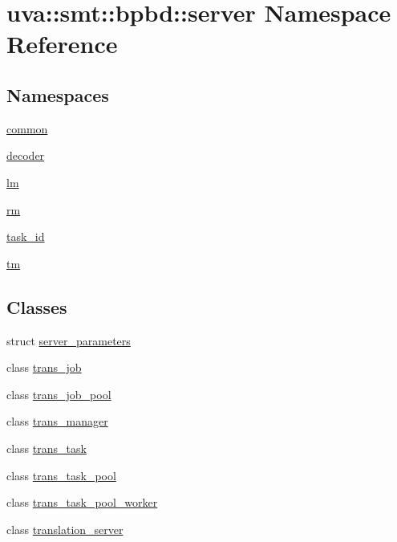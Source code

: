 \hypertarget{namespaceuva_1_1smt_1_1bpbd_1_1server}{}\section{uva\+:\+:smt\+:\+:bpbd\+:\+:server Namespace Reference}
\label{namespaceuva_1_1smt_1_1bpbd_1_1server}
\subsection*{Namespaces}
\begin{DoxyCompactItemize}
\item 
 \hyperlink{namespaceuva_1_1smt_1_1bpbd_1_1server_1_1common}{common}
\item 
 \hyperlink{namespaceuva_1_1smt_1_1bpbd_1_1server_1_1decoder}{decoder}
\item 
 \hyperlink{namespaceuva_1_1smt_1_1bpbd_1_1server_1_1lm}{lm}
\item 
 \hyperlink{namespaceuva_1_1smt_1_1bpbd_1_1server_1_1rm}{rm}
\item 
 \hyperlink{namespaceuva_1_1smt_1_1bpbd_1_1server_1_1task__id}{task\+\_\+id}
\item 
 \hyperlink{namespaceuva_1_1smt_1_1bpbd_1_1server_1_1tm}{tm}
\end{DoxyCompactItemize}
\subsection*{Classes}
\begin{DoxyCompactItemize}
\item 
struct \hyperlink{structuva_1_1smt_1_1bpbd_1_1server_1_1server__parameters}{server\+\_\+parameters}
\item 
class \hyperlink{classuva_1_1smt_1_1bpbd_1_1server_1_1trans__job}{trans\+\_\+job}
\item 
class \hyperlink{classuva_1_1smt_1_1bpbd_1_1server_1_1trans__job__pool}{trans\+\_\+job\+\_\+pool}
\item 
class \hyperlink{classuva_1_1smt_1_1bpbd_1_1server_1_1trans__manager}{trans\+\_\+manager}
\item 
class \hyperlink{classuva_1_1smt_1_1bpbd_1_1server_1_1trans__task}{trans\+\_\+task}
\item 
class \hyperlink{classuva_1_1smt_1_1bpbd_1_1server_1_1trans__task__pool}{trans\+\_\+task\+\_\+pool}
\item 
class \hyperlink{classuva_1_1smt_1_1bpbd_1_1server_1_1trans__task__pool__worker}{trans\+\_\+task\+\_\+pool\+\_\+worker}
\item 
class \hyperlink{classuva_1_1smt_1_1bpbd_1_1server_1_1translation__server}{translation\+\_\+server}
\end{DoxyCompactItemize}
